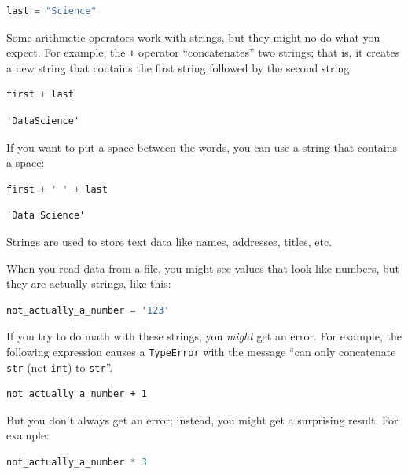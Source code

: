 \begin{lstlisting}[language=Python,style=source]
last = "Science"
\end{lstlisting}

Some arithmetic operators work with strings, but they might no do what
you expect. For example, the \passthrough{\lstinline!+!} operator
``concatenates'' two strings; that is, it creates a new string that
contains the first string followed by the second string:

\begin{lstlisting}[language=Python,style=source]
first + last
\end{lstlisting}

\begin{lstlisting}[style=output]
'DataScience'
\end{lstlisting}

If you want to put a space between the words, you can use a string that
contains a space:

\begin{lstlisting}[language=Python,style=source]
first + ' ' + last
\end{lstlisting}

\begin{lstlisting}[style=output]
'Data Science'
\end{lstlisting}

Strings are used to store text data like names, addresses, titles, etc.

When you read data from a file, you might see values that look like
numbers, but they are actually strings, like this:

\begin{lstlisting}[language=Python,style=source]
not_actually_a_number = '123'
\end{lstlisting}

If you try to do math with these strings, you \emph{might} get an error.
For example, the following expression causes a
\passthrough{\lstinline!TypeError!} with the message ``can only
concatenate \passthrough{\lstinline!str!} (not
\passthrough{\lstinline!int!}) to \passthrough{\lstinline!str!}''.

\begin{lstlisting}[style=output]
not_actually_a_number + 1
\end{lstlisting}

But you don't always get an error; instead, you might get a surprising
result. For example:

\begin{lstlisting}[language=Python,style=source]
not_actually_a_number * 3
\end{lstlisting}

